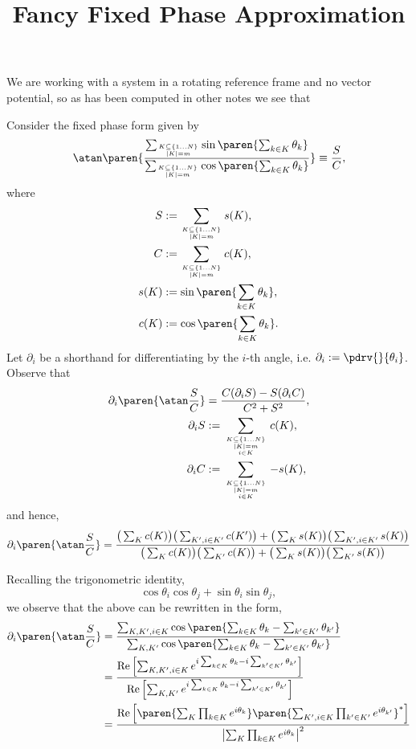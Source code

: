 \documentclass[onecolumn,amsmath,amssymb,nofootinbib,floatfix]{revtex4}
\title{Fancy Fixed Phase Approximation}
\begin{document}
We are working with a system in a rotating reference frame and no vector potential, so as has been computed in other notes we see that

Consider the fixed phase form given by
$$\atan\paren{\frac{\sum_{K\subseteq \{1\dots N\}\atop |K|=m} \sin\paren{\sum_{k\in K} \theta_k}}{\sum_{K\subseteq \{1\dots N\}\atop |K|=m} \cos\paren{\sum_{k\in K} \theta_k}}}\equiv\frac{S}{C},
$$
where
$$
\begin{aligned}
S&:=\sum_{K\subseteq \{1\dots N\}\atop |K|=m} s(K),\\
C&:=\sum_{K\subseteq \{1\dots N\}\atop |K|=m} c(K),\\
s(K)&:=\sin\paren{\sum_{k\in K} \theta_k},\\
c(K)&:=\cos\paren{\sum_{k\in K} \theta_k}.\\
\end{aligned}
$$
Let $\partial_i$ be a shorthand for differentiating by the $i$-th angle, i.e. $\partial_i:=\pdrv{}{\theta_i}$.  Observe that
$$
\begin{aligned}
\partial_i \paren{\atan\frac{S}{C}} &= \frac{C(\partial_i S) - S(\partial_i C)}{C^2+S^2},\\
\partial_i S&:=\sum_{{K\subseteq \{1\dots N\}\atop |K|=m}\atop i\in K} c(K),\\
\partial_i C&:=\sum_{{K\subseteq \{1\dots N\}\atop |K|=m}\atop i\in K} -s(K),\\
\end{aligned}
$$
and hence,
$$
\partial_i \paren{\atan\frac{S}{C}} = \frac{\big(\sum_K c(K)\big)\big(\sum_{K',i\in K'} c(K')\big)+\big(\sum_K s(K)\big)\big(\sum_{K',i\in K'} s(K)\big)}{\big(\sum_K c(K)\big)\big(\sum_{K'} c(K)\big)+\big(\sum_K s(K)\big)\big(\sum_{K'} s(K)\big)}
$$

Recalling the trigonometric identity,
$$\cos\theta_i\cos\theta_j+\sin\theta_i\sin\theta_j,$$
we observe that the above can be rewritten in the form,
$$
\begin{aligned}
\partial_i \paren{\atan\frac{S}{C}}
&= \frac{\sum_{K,K',i\in K}\cos\paren{\sum_{k\in K} \theta_k - \sum_{k'\in K'} \theta_{k'}}}
        {\sum_{K,K'}\cos\paren{\sum_{k\in K} \theta_k - \sum_{k'\in K'} \theta_{k'}}}\\
&= \frac{\text{Re}\left[\sum_{K,K',i\in K}e^{i\sum_{k\in K} \theta_k-i\sum_{k'\in K'} \theta_{k'}}\right]}
        {\text{Re}\left[\sum_{K,K'}e^{i\sum_{k\in K} \theta_k-i\sum_{k'\in K'} \theta_{k'}}\right]}\\
&= \frac{\text{Re}\left[\paren{\sum_{K}\prod_{k\in K}e^{i\theta_k}}\paren{\sum_{K',i\in K}\prod_{k'\in K'}e^{i\theta_{k'}}}^*\right]}
        {\left|\sum_{K}\prod_{k\in K}e^{i\theta_k}\right|^2}\\
\end{aligned}
$$
\end{document}
